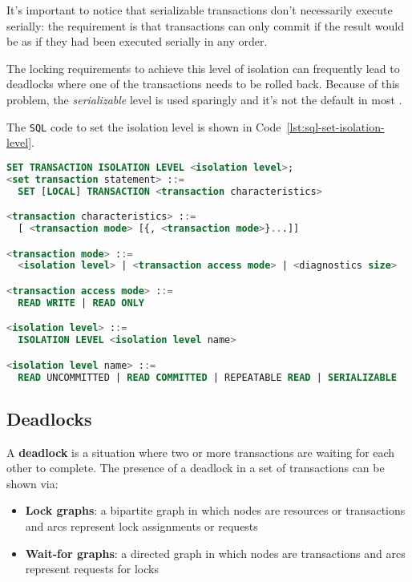 \documentclass[english]{article}
\begin{document}
\bigskip
It's important to notice that serializable transactions don't necessarily execute serially:
the requirement is that transactions can only commit if the result would be as if they had been executed serially in any order.

The locking requirements to achieve this level of isolation can frequently lead to deadlocks where one of the transactions needs to be rolled back.
Because of this problem, the \textit{serializable} level is used sparingly and it's not the default in most \dbms.

\bigskip
The \texttt{SQL} code to set the isolation level is shown in Code~\ref{lst:sql-set-isolation-level}.

\begin{minipage}{\textwidth}
  \bigskip
  \begin{lstlisting}[language=SQL, caption={\texttt{SQL} statement to set the isolation level of a transaction}, label={lst:sql-set-isolation-level}]
SET TRANSACTION ISOLATION LEVEL <isolation level>;
<set transaction statement> ::=
  SET [LOCAL] TRANSACTION <transaction characteristics>

<transaction characteristics> ::=
  [ <transaction mode> [{, <transaction mode>}...]]

<transaction mode> ::=
  <isolation level> | <transaction access mode> | <diagnostics size>

<transaction access mode> ::=
  READ WRITE | READ ONLY

<isolation level> ::=
  ISOLATION LEVEL <isolation level name>

<isolation level name> ::=
  READ UNCOMMITTED | READ COMMITTED | REPEATABLE READ | SERIALIZABLE
\end{lstlisting}
\end{minipage}

\subsection{Deadlocks}
\label{sec:deadlocks}

A \textbf{deadlock} is a situation where two or more transactions are waiting for each other to complete.
The presence of a deadlock in a set of transactions can be shown via:

\begin{itemize}
  \item \textbf{Lock graphs}: a bipartite graph in which nodes are resources or transactions and arcs represent lock assignments or requests
  \item \textbf{Wait-for graphs}: a directed graph in which nodes are transactions and arcs represent requests for locks
\end{itemize}
\end{document}
